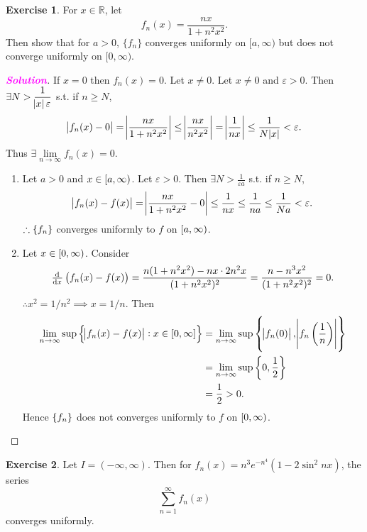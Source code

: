 \documentclass[12pt,openany]{book}
\theoremstyle{definition}
\newtheorem{exercise}{Exercise}[chapter]
\newcommand{\of}[1]{\left( #1 \right)}
\newcommand{\sol}{\textcolor{magenta}{\bf Solution}}
\begin{document}
	\begin{tcolorbox}[colframe=execolor, title={\color{white}\bf}]
		\begin{exercise}
			For \( x \in \mathbb{R} \), let
			\[ f_n(x) = \frac{nx}{1 + n^2x^2}. \]
			Then show that for \( a > 0 \), \( \{f_n\} \) converges uniformly on \([a, \infty)\) but does not converge uniformly on \([0, \infty)\).
		\end{exercise}
	\end{tcolorbox}
	\begin{proof}[\sol]
		If $x=0$ then $f_n(x)=0$. Let $x\neq 0$. Let $x\neq 0$ and $\varepsilon>0$. Then $\displaystyle\exists N>\frac{1}{\abs{x}\varepsilon}$ s.t. if $n\geq N$, \[
		\abs{f_n(x)-0}=\abs{\frac{nx}{1+n^2x^2}}\leq\abs{\frac{nx}{n^2x^2}}=\abs{\frac{1}{nx}}\leq\frac{1}{N\abs{x}}<\varepsilon.
		\] Thus $\exists\lim\limits_{n\to\infty}f_n(x)=0$.
		\begin{enumerate}[(1)]
			\item Let $a>0$ and $x\in\intco{a,\infty}$. Let $\varepsilon>0$. Then $\displaystyle\exists N>\frac{1}{\varepsilon a}$ s.t. if $n\geq N$, \[
			\abs{f_n(x)-f(x)}=\abs{\frac{nx}{1+n^2x^2}-0}\leq\frac{1}{nx}\leq\frac{1}{na}\leq\frac{1}{Na}<\varepsilon.
			\] $\therefore\set{f_n}$ converges uniformly to $f$ on $\intco{a,\infty}$.
			\item Let $x\in\intco{0,\infty}$. Consider $$
			\od{}{x}\of{f_n(x)-f(x)}=\frac{n(1+n^2x^2)-nx\cdot2n^2x}{(1+n^2x^2)^2}=\frac{n-n^3x^2}{(1+n^2x^2)^2}=0.
			$$ $\therefore x^2=1/n^2\implies x=1/n$. Then \begin{align*}
				\lim\limits_{n\to\infty}\sup\set{\abs{f_n(x)-f(x)}:x\in\intcc{0,\infty}}
				&=\lim\limits_{n\to\infty}\sup\set{\abs{f_n(0)},\abs{f_n\of{\frac{1}{n}}}}\\
				&=\lim\limits_{n\to\infty}\sup\set{0,\frac{1}{2}}\\
				&=\frac{1}{2}>0.
			\end{align*} Hence $\set{f_n}$ does not converges uniformly to $f$ on $\intco{0,\infty}$.
		\end{enumerate}
	\end{proof}
	\begin{tcolorbox}[colframe=execolor, title={\color{white}\bf}]
		\begin{exercise}
			Let \( I = (-\infty, \infty) \). Then for \( f_n(x) = n^3e^{-n^4}(1 - 2\sin^2 nx) \), the series
			\[ \sum_{n=1}^{\infty} f_n(x) \]
			converges uniformly.
		\end{exercise}
	\end{tcolorbox}
\end{document}
